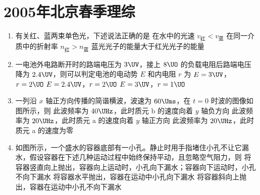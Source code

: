 \documentclass[\gkver]{gaokaozhenti}
\begin{document}
\chapter{2005年北京春季理综}

\begin{enumerate}
\item
有关红、蓝两束单色光，下述说法正确的是
{在水中的光速 $v_{\text{红}}<v_{\text{蓝}}$}
{在同一介质中的折射率 $n_{\text{红}}>n_{\text{蓝}}$}
{蓝光光子的能量大于红光光子的能量}

\item
一电池外电路断开时的路端电压为 $3\UV$，接上 $8\UO$ 的负载电阻后路端电压降为 $2.4\UV$，则可以判定电池的电动势 $E$ 和内电阻 $r$ 为
{$E=3\UV$，$r=2\UO$}
{$E=2.4\UV$，$r=2\UO$}
{$E=3\UV$，$r=1\UO$}

\item
一列沿 $x$ 轴正方向传播的简谐横波，波速为 $60\Ums$，在 $t=0$ 时波的图像如图所示，则
{此波频率为 $40\UHz$，此时质元 b 的速度向着 $y$ 轴负方向}
{此波频率为 $20\UHz$，此时质元 a 的速度向着 $y$ 轴正方向}
{此波频率为 $20\UHz$，此时质元 a 的速度为零}

\item
如图所示，一个盛水的容器底部有一小孔。静止时用手指堵住小孔不让它漏水，假设容器在下述几种运动过程中始终保持平动，且忽略空气阻力，则
{将容器竖直向上抛出，容器向上运动时，小孔向下漏水；容器向下运动时，小孔不向下漏水}
{将容器水平抛出，容器在运动中小孔向下漏水}
{将容器斜向上抛出，容器在运动中小孔不向下漏水}


\end{enumerate}
\end{document}
